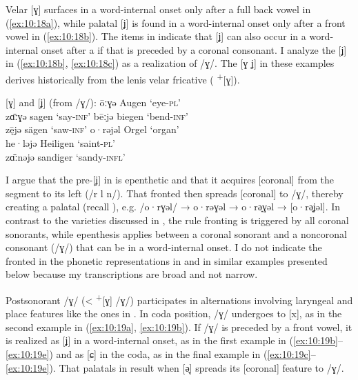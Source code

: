 Velar [ɣ] surfaces in a word-internal onset only after a full back vowel in (\ref{ex:10:18a}), while palatal [ʝ] is found in a word-internal onset only after a front vowel in (\ref{ex:10:18b}). The items in  indicate that [ʝ] can also occur in a word-internal onset after a  if that  is preceded by a coronal consonant. I analyze the [ʝ] in (\ref{ex:10:18b}, \ref{ex:10:18c}) as a realization of /ɣ/. The [ɣ ʝ] in these examples derives historically from the lenis velar fricative ( \textsuperscript{+}[ɣ]).

\ea%
\label{ex:10:18} [ɣ] and [ʝ] (from /ɣ/):
\ea\label{ex:10:18a} ōːɣǝ \tab [oːɣǝ] \tab Augen \tab ‘eye-\textsc{pl}’ \\
    zɑ̄ːɣǝ \tab [zɑːɣǝ] \tab sagen \tab ‘say-\textsc{inf}’ 
\ex\label{ex:10:18b} bēːjǝ \tab [beːʝǝ] \tab biegen \tab ‘bend-\textsc{inf}’ \\
    z\={ę}jǝ \tab [zɛːʝǝ] \tab sägen \tab ‘saw-\textsc{inf}’ 
\ex\label{ex:10:18c} o·rǝjǝl \tab [o·rǝʝǝl] \tab Orgel \tab ‘organ’ \\
    he·lǝjǝ \tab [he·lǝʝǝ] \tab Heiligen \tab ‘saint-\textsc{pl}’ \\
    zɑ̄ːnǝjǝ \tab [zɑːnǝʝǝ] \tab sandiger \tab ‘sandy-\textsc{infl}’ 
    \z
\z 

I argue that the pre-[ʝ]  in  is epenthetic and that it acquires [coronal] from the segment to its left (/r l n/). That fronted  then spreads [coronal] to /ɣ/, thereby creating a palatal  (recall ), e.g. /o·rɣǝl/ → {\textbar}o·rǝɣǝl{\textbar} → {\textbar}o·rə̟ɣǝl{\textbar} → [o·rə̟ʝǝl]. In contrast to the varieties discussed in , the rule fronting  is triggered by all coronal sonorants, while  epenthesis applies between a coronal sonorant and a noncoronal consonant (/ɣ/) that can be in a word-internal onset. I do not indicate the fronted  in the phonetic representations in  and in similar examples presented below because my transcriptions are broad and not narrow.

Postsonorant /ɣ/ (< \textsuperscript{+}[ɣ] /ɣ/) participates in alternations involving laryngeal and place features like the ones in . In coda position, /ɣ/ undergoes  to [x], as in the second example in (\ref{ex:10:19a}, \ref{ex:10:19b}). If /ɣ/ is preceded by a front vowel, it is realized as [ʝ] in a word-internal onset, as in the first example in (\ref{ex:10:19b}--\ref{ex:10:19e}) and as [ɕ] in the coda, as in the final example in (\ref{ex:10:19c}--\ref{ex:10:19e}). That palatals in  result when [ə̟] spreads its [coronal] feature to /ɣ/.

